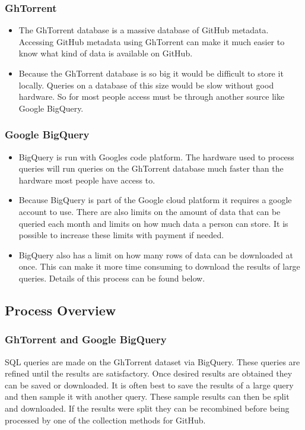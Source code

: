 \documentclass[12pt]{article}
\begin{document}
\subsubsection*{GhTorrent}
\begin{itemize}
    \item The GhTorrent database is a massive database of GitHub metadata. Accessing GitHub metadata using GhTorrent can make it much easier to know what kind of data is available on GitHub.
    
    \item Because the GhTorrent database is so big it would be difficult to store it locally. Queries on a database of this size would be slow without good hardware. So for most people access must be through another source like Google BigQuery. 
\end{itemize}

\subsubsection*{Google BigQuery}
\begin{itemize}
    \item BigQuery is run with Googles code platform. The hardware used to process queries will run queries on the GhTorrent database much faster than the hardware most people have access to.

    \item Because BigQuery is part of the Google cloud platform it requires a google account to use. There are also limits on the amount of data that can be queried each month and limits on how much data a person can store. It is possible to increase these limits with payment if needed.

    \item BigQuery also has a limit on how many rows of data can be downloaded at once. This can make it more time consuming to download the results of large queries. Details of this process can be found below.
\end{itemize}


\subsection{Process Overview}

\subsubsection*{GhTorrent and Google BigQuery}
SQL queries are made on the GhTorrent dataset via BigQuery. These queries are refined until the results are satisfactory. Once desired results are obtained they can be saved or downloaded. It is often best to save the results of a large query and then sample it with another query. These sample results can then be split and downloaded. If the results were split they can be recombined before being processed by one of the collection methods for GitHub.
\end{document}
